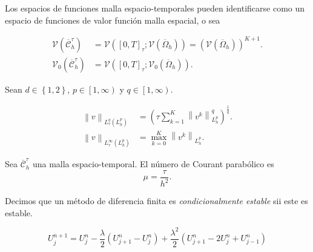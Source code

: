Los espacios de funciones malla espacio-temporales pueden
identificarse como un espacio de funciones de valor función malla
espacial, o sea

\begin{align*}
    \mathcal{V}
    \left(
    \overline{\mathcal{C}}^{\tau}_{h}
    \right) & =
    \mathcal{V}
    \left(
    \left[0,T\right]_{\tau};
    \mathcal{V}
    \left(\overline{\Omega}_{h}\right)
    \right)=
    {
    \left(
    \mathcal{V}\left(\overline{\Omega}_{h}\right)
    \right)
    }^{K+1}.    \\
    \mathcal{V}_{0}
    \left(
    \overline{\mathcal{C}}^{\tau}_{h}
    \right) & =
    \mathcal{V}
    \left(
    \left[0,T\right]_{\tau};
    \mathcal{V}_{0}\left(\overline{\Omega}_{h}\right)
    \right).
\end{align*}

\begin{definition}
    Sean
    \begin{math}
        d\in\left\{1,2\right\}
    \end{math},
    \begin{math}
        p\in
        \left[1,\infty\right)
    \end{math}
    y
    \begin{math}
        q\in\left[1,\infty\right)
    \end{math}.

    \begin{align*}
        {\left\|v\right\|}_{
            L^{q}_{\tau}\left(L^{p}_{h}\right)
        }
         & =
        {\left(
        \tau\sum_{k=1}^{K}
        \left\|v^{k}\right\|^{q}_{L^{p}_{h}}
        \right)}^{\frac{1}{q}}. \\
        {\left\|v\right\|}_{L^{\infty}_{\tau}\left(L^{p}_{h}\right)}
         & =
        \max^{K}_{k=0}
        {\left\|v^{k}\right\|}_{L^{p}_{h}}.
    \end{align*}
\end{definition}

\begin{definition}
    Sea $\overline{\mathcal{C}}^{\tau}_{h}$ una malla
    espacio-temporal.
    El número de Courant parabólico es
    \begin{equation*}
        \mu=
        \dfrac{\tau}{h^{2}}.
    \end{equation*}
\end{definition}

\begin{definition}
    Decimos que un método de diferencia finita es
    \emph{condicionalmente estable} sii este es estable.
\end{definition}

\begin{equation*}
    U^{n+1}_{j}=
    U^{n}_{j}-
    \dfrac{\lambda}{2}
    \left(U^{n}_{j+1}-U^{n}_{j}\right)+
    \dfrac{\lambda^{2}}{2}
    \left(
    U^{n}_{j+1}-
    2U^{n}_{j}+
    U^{n}_{j-1}
    \right)
\end{equation*}